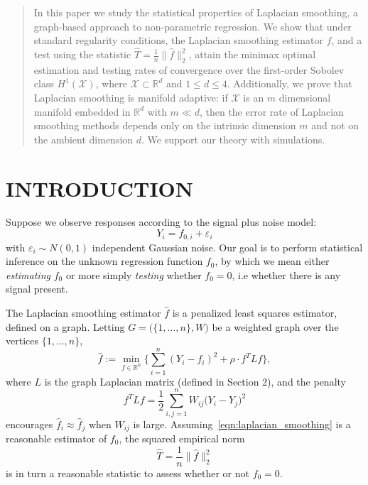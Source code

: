 \documentclass[twoside]{article}
\newcommand{\Reals}{\mathbb{R}}
\newcommand{\1}{\mathbf{1}}
\newcommand{\Rd}{\Reals^d}
\newcommand{\Lap}{L}
\newcommand{\Xset}{\mathcal{X}}
\newcommand{\wh}[1]{\widehat{#1}}
\theoremstyle{definition}
\theoremstyle{remark}
\begin{document}
	
	

\begin{abstract}
	In this paper we study the statistical properties of Laplacian smoothing, a graph-based approach to non-parametric regression. We show that under standard regularity conditions, the Laplacian smoothing estimator $\wh{f}$, and a test using the statistic $\wh{T} = \frac{1}{n}\|\wh{f}\|_2^2$, attain the minimax optimal estimation and testing rates of convergence over the first-order Sobolev class $H^1(\Xset)$, where $\Xset \subset \Rd$ and $1 \leq d \leq 4$. Additionally, we prove that Laplacian smoothing is manifold adaptive: if $\Xset$ is an $m$ dimensional manifold embedded in $\Reals^d$ with $m \ll d$, then the error rate of Laplacian smoothing methods depends only on the intrinsic dimension $m$ and not on the ambient dimension $d$. We support our theory with simulations.
\end{abstract}

\section{INTRODUCTION}

Suppose we observe responses according to the signal plus noise model:
\begin{equation}
\label{eqn:signal_plus_noise_model}
Y_i = f_{0,i} + \varepsilon_i
\end{equation}
with $\varepsilon_i \sim N(0,1)$ independent Gaussian noise. Our goal is to perform statistical inference on the unknown regression function $f_0$, by which we mean either \emph{estimating} $f_0$ or more simply \emph{testing} whether $f_0 = 0$, i.e whether there is any signal present. 

The Laplacian smoothing estimator $\wh{f}$ \citep{smola2003} is a penalized least squares estimator, defined on a graph. Letting $G = \bigl(\{1,\ldots,n\},W\bigr)$ be a weighted graph over the vertices $\{1,\ldots,n\}$, 
\begin{equation}
\label{eqn:laplacian_smoothing}
\wh{f} :=  \min_{f \in \Reals^n} \biggl\{\sum_{i = 1}^{n}(Y_i - f_i)^2 + \rho \cdot f^T \Lap f \biggr\},
\end{equation}
where $\Lap$ is the graph Laplacian matrix (defined in Section 2), and the penalty
\begin{equation*}
f^T \Lap f = \frac{1}{2} \sum_{i,j = 1}^{n} W_{ij}\bigl(Y_i - Y_j\bigr)^2
\end{equation*}
encourages $\wh{f}_i \approx \wh{f}_j$ when $W_{ij}$ is large. Assuming~\eqref{eqn:laplacian_smoothing} is a reasonable estimator of $f_0$, the squared empirical norm
\begin{equation}
\label{eqn:laplacian_smoothing_test}
\wh{T} = \frac{1}{n}\bigl\|\wh{f}\bigr\|_2^2 
\end{equation}
is in turn a reasonable statistic to assess whether or not $f_0 = 0$. 
\end{document}
